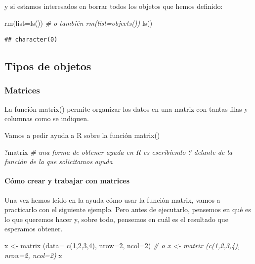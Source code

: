 \documentclass[
]{book}
\newenvironment{Shaded}{\begin{snugshade}}{\end{snugshade}}
\newcommand{\AttributeTok}[1]{\textcolor[rgb]{0.77,0.63,0.00}{#1}}
\newcommand{\CommentTok}[1]{\textcolor[rgb]{0.56,0.35,0.01}{\textit{#1}}}
\newcommand{\DecValTok}[1]{\textcolor[rgb]{0.00,0.00,0.81}{#1}}
\newcommand{\FunctionTok}[1]{\textcolor[rgb]{0.00,0.00,0.00}{#1}}
\newcommand{\NormalTok}[1]{#1}
\newcommand{\OtherTok}[1]{\textcolor[rgb]{0.56,0.35,0.01}{#1}}
\begin{document}
y si estamos interesados en borrar todos los objetos que hemos definido:

\begin{Shaded}
\begin{Highlighting}[]
\FunctionTok{rm}\NormalTok{(}\AttributeTok{list=}\FunctionTok{ls}\NormalTok{()) }\CommentTok{\# o también rm(list=objects())}
\FunctionTok{ls}\NormalTok{()}
\end{Highlighting}
\end{Shaded}

\begin{verbatim}
## character(0)
\end{verbatim}

\hypertarget{tipos-de-objetos}{%
\subsection{Tipos de objetos}\label{tipos-de-objetos}}

\hypertarget{matrices}{%
\subsubsection{Matrices}\label{matrices}}

La función matrix() permite organizar los datos en una matriz con tantas filas y columnas como se indiquen.

Vamos a pedir ayuda a R sobre la función matrix()

\begin{Shaded}
\begin{Highlighting}[]
\NormalTok{?matrix }\CommentTok{\# una forma de obtener ayuda en R es escribiendo ? delante de la función de la que solicitamos ayuda}
\end{Highlighting}
\end{Shaded}

\hypertarget{cuxf3mo-crear-y-trabajar-con-matrices}{%
\paragraph{Cómo crear y trabajar con matrices}\label{cuxf3mo-crear-y-trabajar-con-matrices}}

Una vez hemos leído en la ayuda cómo usar la función matrix, vamos a practicarlo con el siguiente ejemplo. Pero antes de ejecutarlo, pensemos en qué es lo que queremos hacer y, sobre todo, pensemos en cuál es el resultado que esperamos obtener.

\begin{Shaded}
\begin{Highlighting}[]
\NormalTok{x }\OtherTok{\textless{}{-}} \FunctionTok{matrix}\NormalTok{ (}\AttributeTok{data=} \FunctionTok{c}\NormalTok{(}\DecValTok{1}\NormalTok{,}\DecValTok{2}\NormalTok{,}\DecValTok{3}\NormalTok{,}\DecValTok{4}\NormalTok{), }\AttributeTok{nrow=}\DecValTok{2}\NormalTok{, }\AttributeTok{ncol=}\DecValTok{2}\NormalTok{) }\CommentTok{\# o x \textless{}{-} matrix (c(1,2,3,4), nrow=2, ncol=2)}
\NormalTok{x}
\end{Highlighting}
\end{Shaded}
\end{document}
